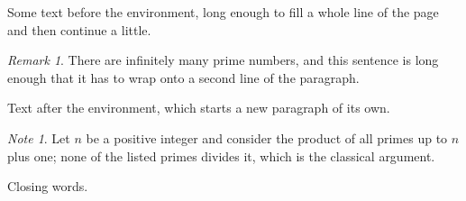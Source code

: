 \documentclass[11pt]{article}
\theoremstyle{remark}
\newtheorem{remark}{Remark}
\newtheorem*{note}{Note}
\begin{document}
Some text before the environment, long enough to fill a whole line of the page and then continue a little.
\begin{remark}
There are infinitely many prime numbers, and this sentence is long enough that it has to wrap onto a second line of the paragraph.
\end{remark}
Text after the environment, which starts a new paragraph of its own.
\begin{note}
Let $n$ be a positive integer and consider the product of all primes up to $n$ plus one; none of the listed primes divides it, which is the classical argument.
\end{note}
Closing words.
\end{document}
